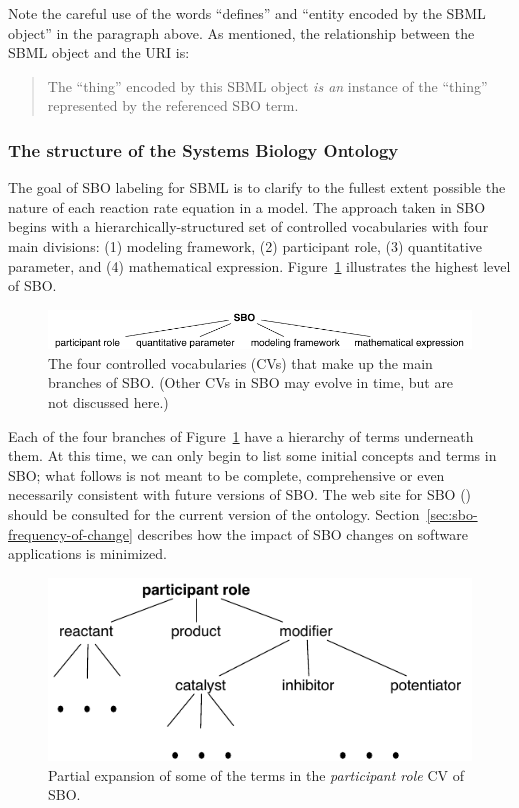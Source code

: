 Note the careful use of the words ``defines'' and ``entity encoded
by the SBML object'' in the paragraph above.  As mentioned, the
relationship between the SBML object and the URI is:
\begin{quote}
  The ``thing'' encoded by this SBML object \emph{is an} instance
  of the ``thing'' represented by the referenced SBO term.
\end{quote}


\subsubsection{The structure of the Systems Biology Ontology}

The goal of SBO labeling for SBML is to clarify to the fullest
extent possible the nature of each reaction rate equation in a
model.  The approach taken in SBO begins with a
hierarchically-structured set of controlled vocabularies with four
main divisions: (1) modeling framework, (2) participant role, (3)
quantitative parameter, and (4) mathematical expression.
Figure~\ref{fig:sbo-top-level} illustrates the highest level of
SBO.

\begin{figure}[tbh]
  \vspace*{1ex}
  \centering
  \includegraphics[scale = 0.9]{figs/sbo-top-level}
  \caption{The four controlled vocabularies (CVs) that make up the
    main branches of SBO.  (Other CVs in SBO may evolve in time,
    but are not discussed here.)}
  \label{fig:sbo-top-level}
\end{figure}

Each of the four branches of Figure~\ref{fig:sbo-top-level} have a
hierarchy of terms underneath them.  At this time, we can only
begin to list some initial concepts and terms in SBO; what follows
is not meant to be complete, comprehensive or even necessarily
consistent with future versions of SBO.  The web site for SBO
(\sboref) should be consulted for the current version of the
ontology.  Section~\ref{sec:sbo-frequency-of-change} describes how
the impact of SBO changes on software applications is minimized.

\begin{figure}[htb]
  \vspace*{1ex}
  \centering
  \includegraphics[scale = 0.9]{figs/sbo-participant-role}
  \caption{Partial expansion of some of the terms in the
    \emph{participant role} CV of SBO.}
  \label{fig:expanded-species}
\end{figure}

